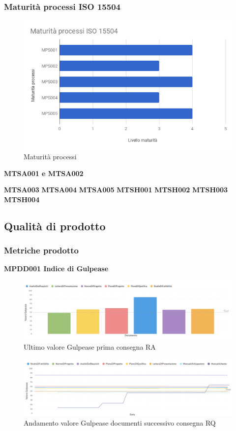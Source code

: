 \documentclass[PianoDiQualifica.tex]{subfiles}
\begin{document}
\subsubsection{Maturità processi ISO 15504}
\begin{figure}[H]
	\centering
	\includegraphics[width=0.7\linewidth]{RA/Processi}
	\caption{Maturità processi}
	\label{fig:processi}
\end{figure}

\textbf{MTSA001 e MTSA002}

\textbf{MTSA003}
\textbf{MTSA004}
\textbf{MTSA005}
\textbf{MTSH001}
\textbf{MTSH002}
\textbf{MTSH003}
\textbf{MTSH004}


\newpage
\subsection{Qualità di prodotto}

\subsubsection{Metriche prodotto}

\textbf{MPDD001 Indice di Gulpease}
\begin{figure}[H]
	\centering
	\includegraphics[width=1\linewidth]{RQ/gulpease}
	\caption{Ultimo valore Gulpease prima consegna RA}
	\label{fig:processi}
\end{figure}

\begin{figure}[H]
	\centering
	\includegraphics[width=1\linewidth]{RQ/gulpeasegrid}
	\caption{Andamento valore Gulpease documenti successivo consegna RQ}
	\label{fig:processi}
\end{figure}
\end{document}
